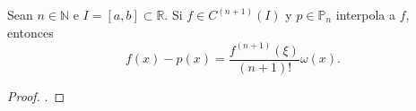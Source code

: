 \begin{frame}
    \begin{theorem}
        Sean $n\in\mathbb{N}$ e
        \begin{math}
            I=
            \left[a,b\right]\subset
            \mathbb{R}
        \end{math}.
        Si $f\in C^{\left(n+1\right)}\left(I\right)$ y
        $p\in\mathbb{P}_{n}$ interpola a $f$, entonces
        \begin{equation*}
            f\left(x\right)-
            p\left(x\right)=
            \dfrac{
                f^{\left(n+1\right)}
                \left(\xi\right)
            }{
                \left(n+1\right)!}
            \omega\left(x\right).
        \end{equation*}
    \end{theorem}

    \begin{proof}
        .
    \end{proof}
\end{frame}